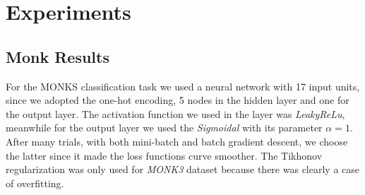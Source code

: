 \section{Experiments}
\label{sec:experiments}
\subsection{Monk Results}
For the MONKS classification task we used a neural network with 17 input units, since we adopted the one-hot encoding, 5 nodes in the hidden layer and one for the output layer. The activation function we used in the layer was \textit{LeakyReLu}, meanwhile for the output layer we used the \textit{Sigmoidal} with its parameter $\alpha=1$. After many trials, with both mini-batch and batch gradient descent, we choose the latter since it made the loss functions curve smoother. The Tikhonov regularization was only used for \textit{MONK3} dataset because there was clearly a case of overfitting.

